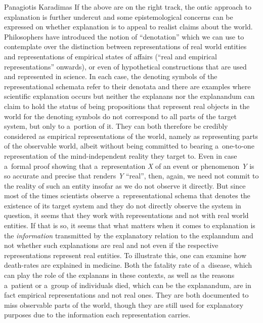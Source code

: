 \begin{artengenv}{Panagiotis Karadimas}
If the above are on the right track, the ontic approach to explanation is further undercut and some epistemological concerns can be expressed on whether explanation is to appeal to realist claims about the world. Philosophers have introduced the notion of ``denotation'' which we can use to contemplate over the distinction between representations of real world entities and representations of empirical states of affairs (``real and empirical representations'' onwards), or even of hypothetical constructions that are used and represented in science. In each case, the denoting symbols of the representational schemata refer to their denotata 
\parencites[][]{russell_denoting_1956}[][]{elgin_telling_2010}[][]{salis_capturing_2020} %
 and there are examples where scientific explanation occurs but neither the explanans nor the explanandum can claim to hold the status of being propositions that represent real objects in the world for the denoting symbols do not correspond to all parts of the target system, but only to a~portion of it. They can both therefore be credibly considered as empirical representations of the world, namely as representing parts of the observable world, albeit without being committed to bearing a~one-to-one representation of the mind-independent reality they target to. Even in case a~formal proof showing that a~representation \textit{X} of an event or phenomenon \textit{Y} is so accurate and precise that renders \textit{Y} ``real'', then, again, we need not commit to the reality of such an entity insofar as we do not observe it directly. But since most of the times scientists observe a~representational schema that denotes the existence of its target system and they do not directly observe the system in question, it seems that they work with representations and not with real world entities. If that is so, it seems that what matters when it comes to explanation is the \textit{information} transmitted by the explanatory relation to the explanndum and not whether such explanations are real and not even if the respective representations represent real entities. To illustrate this, one can examine how death-rates are explained in medicine. Both the fatality rate of a~disease, which can play the role of the explanans in these contexts, as well as the reasons a~patient or a~group of individuals died, which can be the explanandum, are in fact empirical representations and not real ones. They are both documented to miss observable parts of the world, though they are still used for explanatory purposes due to the information each representation carries.


\end{artengenv}
